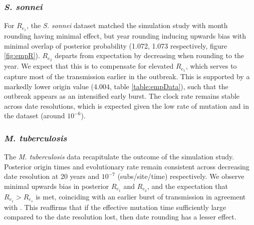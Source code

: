 \documentclass{article}
\begin{document}
\begin{spacing}{1.5}
\subsubsection*{\textit{S. sonnei}}
For $R_{e_1}$, the \textit{S. sonnei} dataset matched the simulation study with month rounding having minimal effect, but year rounding inducing upwards bias with minimal overlap of posterior probability (1.072, 1.073 respectively, figure \ref{fig:empR}). $R_{e_2}$ departs from expectation by decreasing when rounding to the year. We expect that this is to compensate for elevated $R_{e_1}$, which serves to capture most of the transmission earlier in the outbreak. This is supported by a markedly lower origin value (4.004, table \ref{table:empData}), such that the outbreak appears as an intensified early burst. The clock rate remains stable across date resolutions, which is expected given the low rate of mutation and in the dataset (around $10^{-6}$).

\subsubsection*{\textit{M. tuberculosis}}
The \textit{M. tuberculosis} data recapitulate the outcome of the simulation study. Posterior origin times and evolutionary rate remain consistent across decreasing date resolution at 20 years and $10^{-7}$ (subs/site/time) respectively. We observe minimal upwards bias in posterior $R_{e_1}$ and $R_{e_2}$, and the expectation that $R_{e_1} > R_{e_s}$ is met, coinciding with an earlier burst of transmission in agreement with \citet{kuhnert_tuberculosis_2018}. This reaffirms that if the effective mutation time sufficiently large compared to the date resolution lost, then date rounding has a lesser effect.



\end{spacing}
\end{document}
